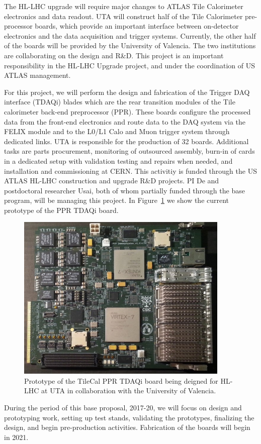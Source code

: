 The HL-LHC upgrade will require major changes to ATLAS Tile Calorimeter electronics and data readout.  UTA will construct half of the Tile Calorimeter pre-processor boards, which provide an important interface between on-detector electronics and the data acquisition and trigger systems. Currently, the other half of the boards will be provided by the University of Valencia. The two institutions are collaborating on the design and R\&D. This project is an important responsibility in the HL-LHC Upgrade project, and under the coordination of US ATLAS management.

For this project, we will perform the design and fabrication of the Trigger DAQ interface (TDAQi) blades which are the rear transition modules of the Tile calorimeter back-end preprocessor (PPR). These boards configure the processed data from the front-end electronics and route data to the DAQ system via the FELIX module and to the L0/L1 Calo and Muon trigger system through dedicated links. UTA is responsible for the production of 32 boards. Additional tasks are parts procurement, monitoring of outsourced assembly, burn-in of cards in a dedicated setup with validation testing and repairs when needed, and installation and commissioning at CERN. This activitiy is funded through the US ATLAS HL-LHC construction and upgrade R\&D projects. PI De and postdoctoral researcher Usai, both of whom partially funded through the base program, will be managing this project.
In Figure~\ref{ppr_proto} we show the current prototype of the PPR TDAQi board.

\begin{figure}[hbt]
\begin{center}
  \includegraphics[width=4in]{De/atl_ppr_proto.jpg}
  \caption{Prototype of the TileCal PPR TDAQi board being deigned for HL-LHC at UTA in collaboration with the University of Valencia.}
  \label{ppr_proto}
\end{center}
\end{figure}

During the period of this base proposal, 2017-20, we will focus on design and prototyping work, setting up test stands, validating the prototypes, finalizing the design, and begin pre-production activities. Fabrication of the boards will begin in 2021.